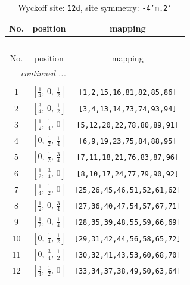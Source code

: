\documentclass[fleqn,8pt]{jsarticle}
\begin{document}
\begin{longtable}{ccc}
\caption{Wyckoff site: {\tt 12d}, site symmetry: {\tt -4'm.2'}}
 \\
 \hline \hline
No. & position & mapping \\ \hline \endfirsthead

\multicolumn{2}{l}{\tablename\ \thetable{}} \\
 \hline \hline
No. & position & mapping \\ \hline \endhead

 \hline \hline
\multicolumn{2}{r}{\footnotesize\it continued ...} \\ \endfoot

 \hline \hline
\multicolumn{2}{r}{} \\ \endlastfoot

1 & $\left[ \frac{1}{4},\, 0,\, \frac{1}{2} \right]$ & {\tt [1,2,15,16,81,82,85,86]} \\ \hline
2 & $\left[ \frac{3}{4},\, 0,\, \frac{1}{2} \right]$ & {\tt [3,4,13,14,73,74,93,94]} \\ \hline
3 & $\left[ \frac{1}{2},\, \frac{1}{4},\, 0 \right]$ & {\tt [5,12,20,22,78,80,89,91]} \\ \hline
4 & $\left[ 0,\, \frac{1}{2},\, \frac{1}{4} \right]$ & {\tt [6,9,19,23,75,84,88,95]} \\ \hline
5 & $\left[ 0,\, \frac{1}{2},\, \frac{3}{4} \right]$ & {\tt [7,11,18,21,76,83,87,96]} \\ \hline
6 & $\left[ \frac{1}{2},\, \frac{3}{4},\, 0 \right]$ & {\tt [8,10,17,24,77,79,90,92]} \\ \hline
7 & $\left[ \frac{1}{4},\, \frac{1}{2},\, 0 \right]$ & {\tt [25,26,45,46,51,52,61,62]} \\ \hline
8 & $\left[ \frac{1}{2},\, 0,\, \frac{3}{4} \right]$ & {\tt [27,36,40,47,54,57,67,71]} \\ \hline
9 & $\left[ \frac{1}{2},\, 0,\, \frac{1}{4} \right]$ & {\tt [28,35,39,48,55,59,66,69]} \\ \hline
10 & $\left[ 0,\, \frac{1}{4},\, \frac{1}{2} \right]$ & {\tt [29,31,42,44,56,58,65,72]} \\ \hline
11 & $\left[ 0,\, \frac{3}{4},\, \frac{1}{2} \right]$ & {\tt [30,32,41,43,53,60,68,70]} \\ \hline
12 & $\left[ \frac{3}{4},\, \frac{1}{2},\, 0 \right]$ & {\tt [33,34,37,38,49,50,63,64]} \\
\end{longtable}
\renewcommand{\arraystretch}{1.2}
\end{document}
